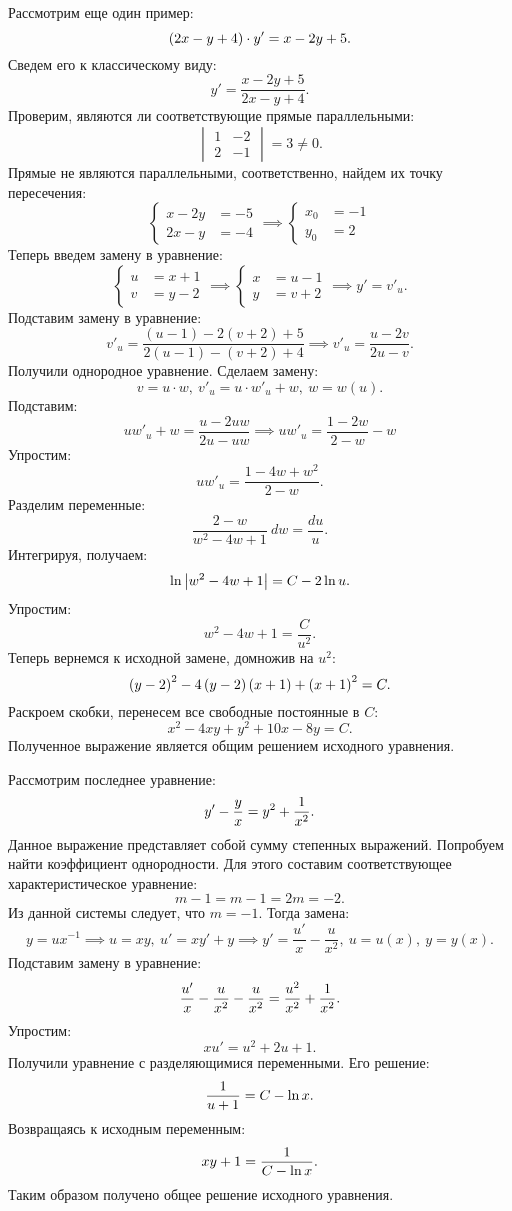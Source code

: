 		Рассмотрим еще один пример:
		\[ \left( 2x - y + 4 \right) \cdot y' = x - 2y + 5. \]
		Сведем его к классическому виду:
		\[ y' = \frac{x - 2y + 5}{2x - y + 4}. \]
		Проверим, являются ли соответствующие прямые параллельными:
		\[ \begin{vmatrix} 1 & -2 \\ 2 & -1 \end{vmatrix} = 3 \neq 0. \]
		Прямые не являются параллельными, соответственно, найдем их точку пересечения:
		\[ \left\lbrace \begin{split} x - 2y &= -5 \\ 2x - y &= -4 \end{split} \right. \implies \left\lbrace \begin{split} x_0 &= -1 \\ y_0 &= 2 \end{split} \right. \]
		Теперь введем замену в уравнение:
		\[ \left\lbrace \begin{split} u &= x + 1 \\ v &= y - 2 \end{split} \right. \implies \left\lbrace \begin{split} x &= u - 1 \\ y &= v + 2 \end{split} \right. \implies y' = v'_u. \]
		Подставим замену в уравнение:
		\[ v'_u = \frac{(u - 1) - 2(v + 2) + 5}{2 (u - 1) - (v + 2) + 4} \implies v'_u = \frac{u - 2v}{2u - v}. \]
		Получили однородное уравнение. Сделаем замену:
		\[ v = u \cdot w, ~ v'_u = u \cdot w'_u + w, ~ w = w(u). \]
		Подставим:
		\[ uw'_u + w = \frac{u - 2uw}{2u - uw} \implies uw'_u = \frac{1 - 2w}{2 - w} - w \]
		Упростим:
		\[ uw'_u = \frac{1 - 4w + w^2}{2 - w}. \]
		Разделим переменные:
		\[ \frac{2 - w}{w^2 - 4w + 1} ~ dw = \frac{du}{u}. \]
		Интегрируя, получаем:
		\[ \ln\left\vert w^2 - 4w + 1 \right\vert = C - 2 \ln{u}. \]
		Упростим:
		\[ w^2 - 4w + 1 = \frac{C}{u^2}. \]
		Теперь вернемся к исходной замене, домножив на $u^2$:
		\[ \left( y - 2 \right)^2 - 4 \left( y - 2 \right) \left( x + 1 \right) + \left( x + 1 \right)^2 = C. \]
		Раскроем скобки, перенесем все свободные постоянные в $C$:
		\[ x^2 - 4xy + y^2 + 10x - 8 y = C. \]
		Полученное выражение является общим решением исходного уравнения.

		Рассмотрим последнее уравнение:
		\[ y' - \frac{y}{x} = y^2 + \frac{1}{x^2}. \]
		Данное выражение представляет собой сумму степенных выражений. Попробуем найти коэффициент однородности. Для этого составим соответствующее характеристическое уравнение:
		\[ m - 1 = m - 1 = 2m = -2. \]
		Из данной системы следует, что $m = -1$.
		Тогда замена:
		\[ y = ux^{-1} \implies u = xy, ~ u' = xy' + y \implies y' = \frac{u'}{x} - \frac{u}{x^2}, ~ u = u(x), ~ y = y(x). \]
		Подставим замену в уравнение:
		\[ \frac{u'}{x} - \frac{u}{x^2} - \frac{u}{x^2} = \frac{u^2}{x^2} + \frac{1}{x^2}. \]
		Упростим:
		\[ xu' = u^2 + 2u + 1. \]
		Получили уравнение с разделяющимися переменными. Его решение:
		\[ \frac{1}{u + 1} = C - \ln{x}. \]
		Возвращаясь к исходным переменным:
		\[ xy + 1 = \frac{1}{C - \ln{x}}. \]
		Таким образом получено общее решение исходного уравнения.


